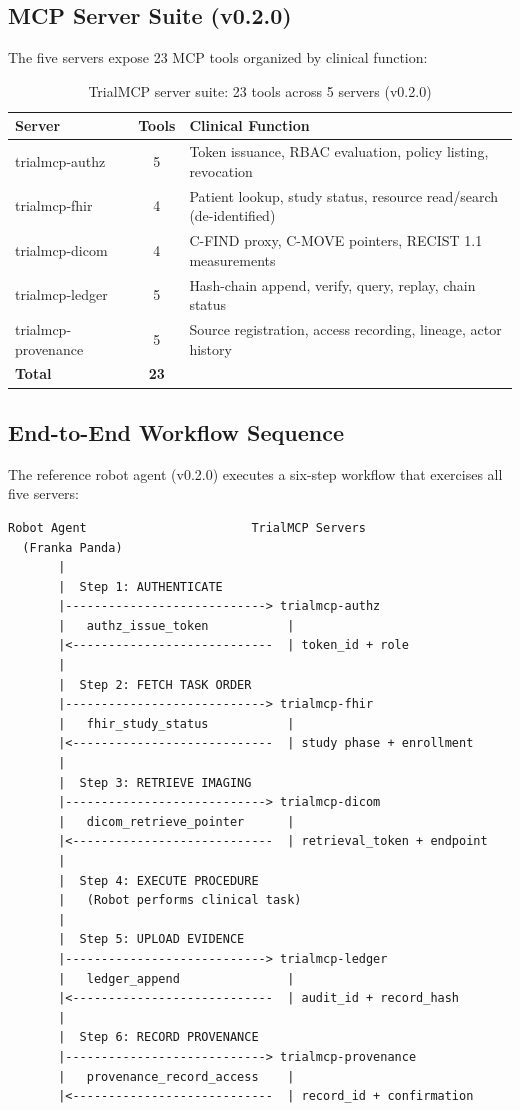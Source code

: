 \documentclass[10pt,letterpaper]{article}
\begin{document}
\subsection{MCP Server Suite (v0.2.0)}

The five servers expose 23 MCP tools organized by clinical function:

\begin{table}[H]
\centering
\caption{TrialMCP server suite: 23 tools across 5 servers (v0.2.0)}
\label{tab:servers}
\small
\begin{tabularx}{\textwidth}{l c X}
\toprule
\textbf{Server} & \textbf{Tools} & \textbf{Clinical Function} \\
\midrule
trialmcp-authz & 5 & Token issuance, RBAC evaluation, policy listing, revocation \\
trialmcp-fhir & 4 & Patient lookup, study status, resource read/search (de-identified) \\
trialmcp-dicom & 4 & C-FIND proxy, C-MOVE pointers, RECIST 1.1 measurements \\
trialmcp-ledger & 5 & Hash-chain append, verify, query, replay, chain status \\
trialmcp-provenance & 5 & Source registration, access recording, lineage, actor history \\
\midrule
\textbf{Total} & \textbf{23} & \\
\bottomrule
\end{tabularx}
\end{table}

\subsection{End-to-End Workflow Sequence}

The reference robot agent (v0.2.0) executes a six-step workflow that exercises all five servers:

\begin{lstlisting}[title={\textbf{Robot Agent Workflow Sequence (6 Steps)}}]
  Robot Agent                       TrialMCP Servers
  (Franka Panda)
       |
       |  Step 1: AUTHENTICATE
       |----------------------------> trialmcp-authz
       |   authz_issue_token           |
       |<----------------------------  | token_id + role
       |
       |  Step 2: FETCH TASK ORDER
       |----------------------------> trialmcp-fhir
       |   fhir_study_status           |
       |<----------------------------  | study phase + enrollment
       |
       |  Step 3: RETRIEVE IMAGING
       |----------------------------> trialmcp-dicom
       |   dicom_retrieve_pointer      |
       |<----------------------------  | retrieval_token + endpoint
       |
       |  Step 4: EXECUTE PROCEDURE
       |   (Robot performs clinical task)
       |
       |  Step 5: UPLOAD EVIDENCE
       |----------------------------> trialmcp-ledger
       |   ledger_append               |
       |<----------------------------  | audit_id + record_hash
       |
       |  Step 6: RECORD PROVENANCE
       |----------------------------> trialmcp-provenance
       |   provenance_record_access    |
       |<----------------------------  | record_id + confirmation
\end{lstlisting}
\end{document}
